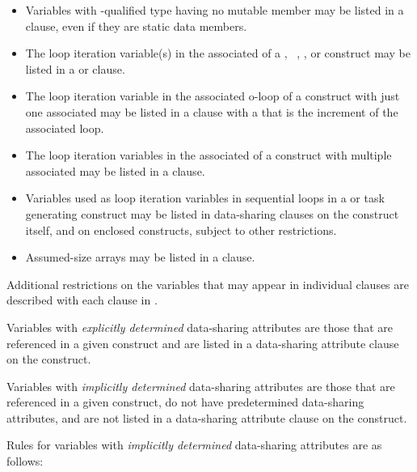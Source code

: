 {{{{\begin{itemize}
\item Variables with -qualified type having no mutable member may be listed in a
 clause, even if they are static data members.
\end{itemize}
\ccppspecificend

\fortranspecificstart
\begin{itemize}
\item The loop iteration variable(s) in the associated  of a , 
~, , or 
construct may be listed in a  or  clause. 

\item The loop iteration variable in the associated o-loop of a  construct with just 
one associated  may be listed in a  clause with a 
that is the increment of the associated loop.

\item The loop iteration variables in the associated  of a  construct with 
multiple associated  may be listed in a  clause. 

\item Variables used as loop iteration variables in sequential loops in a  
or task generating construct may be listed in data-sharing clauses on the construct itself, and on 
enclosed constructs, subject to other restrictions.

\item Assumed-size arrays may be listed in a  clause.
\end{itemize}
\fortranspecificend

Additional restrictions on the variables that may appear in individual clauses are 
described with each clause in .

Variables with \emph{explicitly determined} data-sharing attributes are those that are referenced 
in a given construct and are listed in a data-sharing attribute clause on the construct.

Variables with \emph{implicitly determined} data-sharing attributes are those that are referenced 
in a given construct, do not have predetermined data-sharing attributes, and are not 
listed in a data-sharing attribute clause on the construct.

Rules for variables with \emph{implicitly determined} data-sharing attributes are as follows:

}}}}
